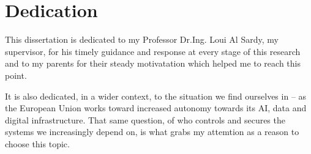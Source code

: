 \chapter*{Dedication}

This dissertation is dedicated to my Professor Dr.Ing. Loui Al Sardy, my supervisor, for his timely guidance and response at every stage of this research and to my parents for their steady motivatation which helped me to reach this point.

It is also dedicated, in a wider context, to the situation we find ourselves in -- as the European Union works toward increased autonomy towards its AI, data and digital infrastructure. That same question, of who controls and secures the systems we increasingly depend on, is what grabs my attemtion as a reason to choose this topic.